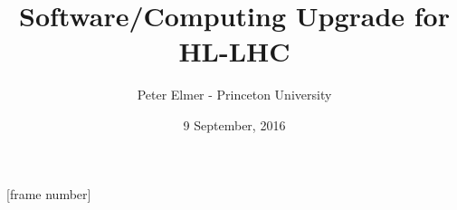 \documentclass{beamer}
\title{Software/Computing Upgrade for HL-LHC}
\author{Peter Elmer - Princeton University}
\date{9 September, 2016}
\begin{document}
\maketitle

%
%

[frame number]









%
















%

%


\end{document}
